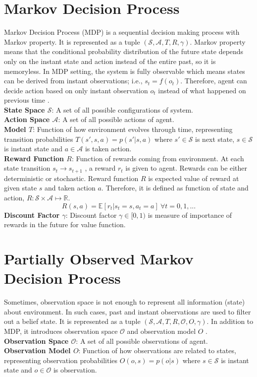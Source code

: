 \section{Markov Decision Process}
\label{sec:mdp}
Markov Decision Process (MDP) is a sequential decision making process with Markov property. It is represented as a tuple $(\mathcal{S},\mathcal{A},T,R,\gamma)$. Markov property means that the conditional probability distribution of the future state depends only on the instant state and action instead of the entire past, so it is memoryless. In MDP setting, the system is fully observable which means states can be derived from instant observations; i.e., $s_t=f(o_t)$. Therefore, agent can decide action based on only instant observation $o_t$ instead of what happened on previous time \cite{francois-lavet_introduction_2018}. \\
\textbf{State Space $\mathcal{S}$}: A set of all possible configurations of system. \\
\textbf{Action Space $\mathcal{A}$}: A set of all possible actions of agent. \\
\textbf{Model $T$}: Function of how environment evolves through time, representing transition probabilities $T(s',s,a) = p(s'|s,a)$ where $s' \in \mathcal{S}$ is next state, $s \in \mathcal{S}$ is instant state and $a \in \mathcal{A}$ is taken action. \\
\textbf{Reward Function $R$}: Function of rewards coming from environment. At each state transition $s_t \rightarrow s_{t+1}$ , a reward $r_t$ is given to agent. Rewards can be either deterministic or stochastic. Reward function $R$ is expected value of reward at given state $s$ and taken action $a$. Therefore, it is defined as function of state and action, $R \colon \mathcal{S} \times \mathcal{A} \mapsto \mathbb{R}$. \\
\begin{equation}
R(s,a) = \mathbb{E}[r_t|s_t=s, a_t=a] \: \forall t = 0,1, ...
\end{equation}
\textbf{Discount Factor $\gamma$}: Discount factor $\gamma \in [0,1)$ is measure of importance of rewards in the future for value function. \\
\section{Partially Observed Markov Decision Process}
\label{sec:pomdp}
Sometimes, observation space is not enough to represent all information (state) about environment. In such cases, past and instant observations are used to filter out a belief state. It is represented as a tuple $(\mathcal{S},\mathcal{A},T,R,\mathcal{O},O,\gamma)$. In addition to MDP, it introduces observation space $\mathcal{O}$ and observation model $O$ \cite{francois-lavet_introduction_2018}. \\
\textbf{Observation Space $\mathcal{O}$}: A set of all possible observations of agent. \\
\textbf{Observation Model $O$}: Function of how observations are related to states, representing observation probabilities $O(o,s) = p(o|s)$ where $s \in \mathcal{S}$ is instant state and $o \in \mathcal{O}$ is observation. \\ 
